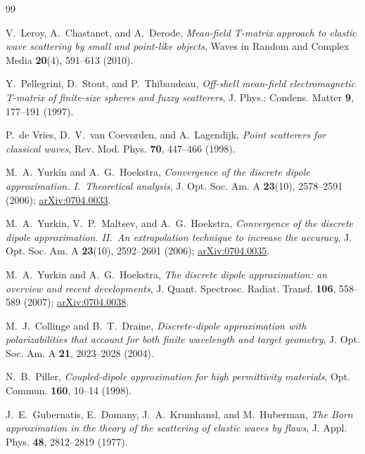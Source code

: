 \documentclass[11pt,a4paper]{article}
\begin{document}
\begin{thebibliography}{99}

V.~Leroy, A.~Chastanet, and A.~Derode,
\emph{Mean-field T-matrix approach to elastic wave scattering by
small and point-like objects},
Waves in Random and Complex Media \textbf{20}(4), 591--613 (2010).

Y.~Pellegrini, D.~Stout, and P.~Thibaudeau,
\emph{Off-shell mean-field electromagnetic T-matrix of finite-size
spheres and fuzzy scatterers},
J. Phys.: Condens. Matter \textbf{9}, 177--191 (1997).

P.~de Vries, D.~V.~van Coevorden, and A.~Lagendijk,
\emph{Point scatterers for classical waves},
Rev. Mod. Phys. \textbf{70}, 447--466 (1998).

M.~A.~Yurkin and A.~G.~Hoekstra,
\emph{Convergence of the discrete dipole approximation. I.\
Theoretical analysis},
J. Opt. Soc. Am. A \textbf{23}(10), 2578--2591 (2006);
\href{https://arxiv.org/abs/0704.0033}{arXiv:0704.0033}.

M.~A.~Yurkin, V.~P.~Maltsev, and A.~G.~Hoekstra,
\emph{Convergence of the discrete dipole approximation. II.\
An extrapolation technique to increase the accuracy},
J. Opt. Soc. Am. A \textbf{23}(10), 2592--2601 (2006);
\href{https://arxiv.org/abs/0704.0035}{arXiv:0704.0035}.

M.~A.~Yurkin and A.~G.~Hoekstra,
\emph{The discrete dipole approximation: an overview and recent
developments},
J. Quant. Spectrosc. Radiat. Transf. \textbf{106}, 558--589 (2007);
\href{https://arxiv.org/abs/0704.0038}{arXiv:0704.0038}.

M.~J.~Collinge and B.~T.~Draine,
\emph{Discrete-dipole approximation with polarizabilities that account
for both finite wavelength and target geometry},
J. Opt. Soc. Am. A \textbf{21}, 2023--2028 (2004).

N.~B.~Piller,
\emph{Coupled-dipole approximation for high permittivity materials},
Opt. Commun. \textbf{160}, 10--14 (1998).

J.~E.~Gubernatis, E.~Domany, J.~A.~Krumhansl, and M.~Huberman,
\emph{The Born approximation in the theory of the scattering of
elastic waves by flaws},
J. Appl. Phys. \textbf{48}, 2812--2819 (1977).


\end{thebibliography}
\end{document}
